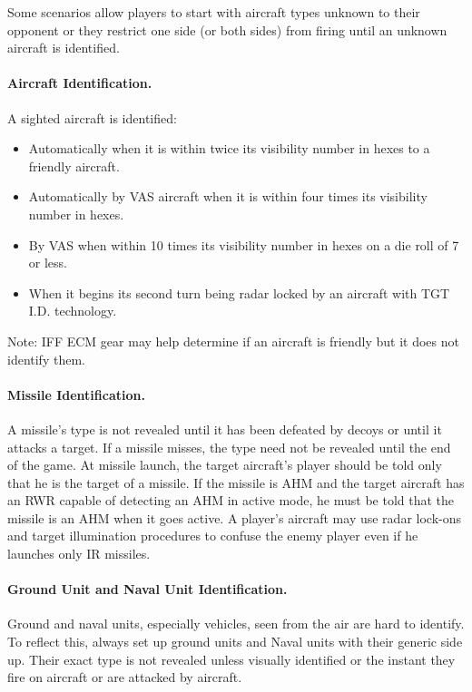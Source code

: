 \begin{advancedrules}
Some scenarios allow players to start with aircraft types unknown to their opponent or they restrict one side (or both sides) from firing until an unknown aircraft is identified.

\paragraph{Aircraft Identification.} A sighted aircraft is identified:

\begin{itemize}

    \item Automatically when it is within twice its visibility number in hexes to a friendly aircraft.

    \item Automatically by VAS aircraft when it is within four times its visibility number in hexes.

    \item By VAS when within 10 times its visibility number in hexes on a die roll of 7 or less.

    \item When it begins its second turn being radar locked by an aircraft with TGT I.D. technology.

\end{itemize}

Note: IFF ECM gear may help determine if an aircraft is friendly but it does not identify them.

\paragraph{Missile Identification.} A missile's type is not revealed until it has been defeated by decoys or until it attacks a target. If a missile misses, the type need not be revealed until the end of the game. At missile launch, the target aircraft's player should be told only that he is the target of a missile. If the missile is AHM and the target aircraft has an RWR capable of detecting an AHM in active mode, he must be told that the missile is an AHM when it goes active. A player's aircraft may use radar lock-ons and target illumination procedures to confuse the enemy player even if he launches only IR missiles.

\paragraph{Ground Unit and Naval Unit Identification.} Ground and naval units, especially vehicles, seen from the air are hard to identify. To reflect this, always set up ground units and Naval units with their generic side up. Their exact type is not revealed unless visually identified or the instant they fire on aircraft or are attacked by aircraft.


\end{advancedrules}

